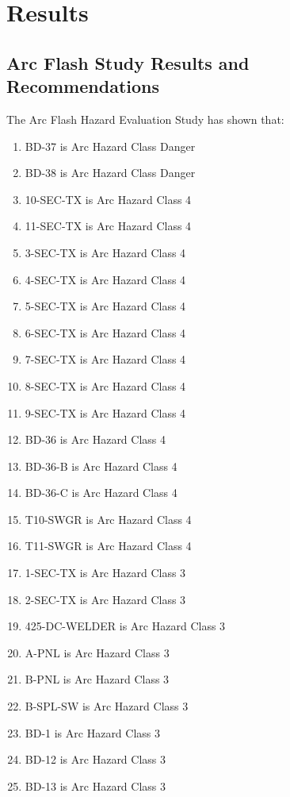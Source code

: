
\section{Results}
\label{af:results}

\subsection{Arc Flash Study Results and Recommendations}
\label{af:results:afrr}

The Arc Flash Hazard Evaluation Study has shown that:
\begin{enumerate}
\item BD-37 is Arc Hazard Class Danger
\item BD-38 is Arc Hazard Class Danger
\item 10-SEC-TX is Arc Hazard Class 4
\item 11-SEC-TX is Arc Hazard Class 4
\item 3-SEC-TX is Arc Hazard Class 4
\item 4-SEC-TX is Arc Hazard Class 4
\item 5-SEC-TX is Arc Hazard Class 4
\item 6-SEC-TX is Arc Hazard Class 4
\item 7-SEC-TX is Arc Hazard Class 4
\item 8-SEC-TX is Arc Hazard Class 4
\item 9-SEC-TX is Arc Hazard Class 4
\item BD-36 is Arc Hazard Class 4
\item BD-36-B is Arc Hazard Class 4
\item BD-36-C is Arc Hazard Class 4
\item T10-SWGR is Arc Hazard Class 4
\item T11-SWGR is Arc Hazard Class 4
\item 1-SEC-TX is Arc Hazard Class 3
\item 2-SEC-TX is Arc Hazard Class 3
\item 425-DC-WELDER is Arc Hazard Class 3
\item A-PNL is Arc Hazard Class 3
\item B-PNL is Arc Hazard Class 3
\item B-SPL-SW is Arc Hazard Class 3
\item BD-1 is Arc Hazard Class 3
\item BD-12 is Arc Hazard Class 3
\item BD-13 is Arc Hazard Class 3

\end{enumerate}

